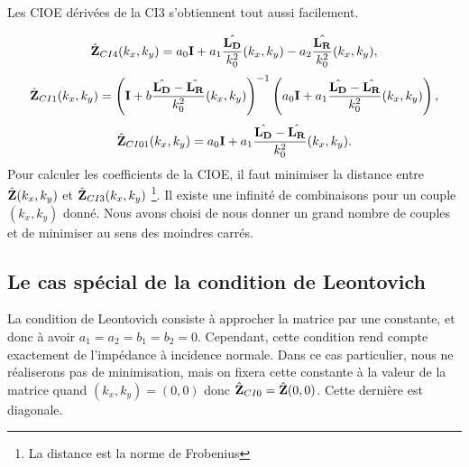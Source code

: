     Les CIOE dérivées de la CI3 s'obtiennent tout aussi facilement.

    \begin{equation*}
        \hat{\mathbf{Z}}_{CI4}(k_x,k_y) = a_0 \mathbf{I} + a_1 \dfrac{\hat{\mathbf{L_D}}}{k_0^2}(k_x,k_y) - a_2 \dfrac{\hat{\mathbf{L_R}}}{k_0^2}(k_x,k_y),
    \end{equation*}
    \begin{equation*}
        \hat{\mathbf{Z}}_{CI1}(k_x,k_y) =  \left(\mathbf{I} + b \dfrac{\hat{\mathbf{L_D}} - \hat{\mathbf{L_R}}}{k_0^2}(k_x,k_y) \right)^{-1}\left(a_0\mathbf{I} + a_1 \dfrac{\hat{\mathbf{L_D}} - \hat{\mathbf{L_R}}}{k_0^2}(k_x,k_y) \right),
    \end{equation*}
    \begin{equation*}
        \hat{\mathbf{Z}}_{CI01}(k_x,k_y) =  a_0\mathbf{I} + a_1 \dfrac{\hat{\mathbf{L_D}} - \hat{\mathbf{L_R}}}{k_0^2}(k_x,k_y).
    \end{equation*}
    Pour calculer les coefficients de la CIOE, il faut minimiser la distance entre \(\hat{\mathbf{Z}}(k_x,k_y)\) et \(\hat{\mathbf{Z}}_{CI3}(k_x,k_y)\) \footnote{La distance est la norme de Frobenius}. Il existe une infinité de combinaisons pour un couple \((k_x,k_y)\) donné. Nous avons choisi de nous donner un grand nombre de couples et de minimiser au sens des moindres carrés.

  \subsection{Le cas spécial de la condition de Leontovich}

    La condition de Leontovich consiste à approcher la matrice par une constante, et donc à avoir \(a_1=a_2=b_1=b_2=0\). Cependant, cette condition rend compte exactement de l'impédance à incidence normale. Dans ce cas particulier, nous ne réaliserons pas de minimisation, mais on fixera cette constante à la valeur de la matrice quand \((k_x,k_y) = (0,0)\) donc \( \hat{\mathbf{Z}}_{CI0}  = \hat{\mathbf{Z}}(0,0)\). Cette dernière est diagonale.
